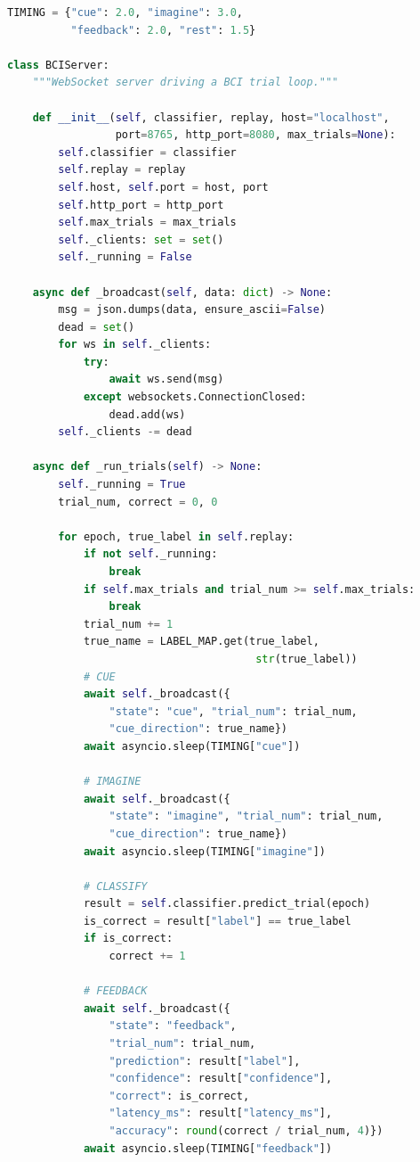 \begin{lstlisting}[language=Python, caption={在线仿真服务端 \texttt{src/online/server.py}\label{code:server}}]
TIMING = {"cue": 2.0, "imagine": 3.0,
          "feedback": 2.0, "rest": 1.5}

class BCIServer:
    """WebSocket server driving a BCI trial loop."""

    def __init__(self, classifier, replay, host="localhost",
                 port=8765, http_port=8080, max_trials=None):
        self.classifier = classifier
        self.replay = replay
        self.host, self.port = host, port
        self.http_port = http_port
        self.max_trials = max_trials
        self._clients: set = set()
        self._running = False

    async def _broadcast(self, data: dict) -> None:
        msg = json.dumps(data, ensure_ascii=False)
        dead = set()
        for ws in self._clients:
            try:
                await ws.send(msg)
            except websockets.ConnectionClosed:
                dead.add(ws)
        self._clients -= dead

    async def _run_trials(self) -> None:
        self._running = True
        trial_num, correct = 0, 0

        for epoch, true_label in self.replay:
            if not self._running:
                break
            if self.max_trials and trial_num >= self.max_trials:
                break
            trial_num += 1
            true_name = LABEL_MAP.get(true_label,
                                       str(true_label))
            # CUE
            await self._broadcast({
                "state": "cue", "trial_num": trial_num,
                "cue_direction": true_name})
            await asyncio.sleep(TIMING["cue"])

            # IMAGINE
            await self._broadcast({
                "state": "imagine", "trial_num": trial_num,
                "cue_direction": true_name})
            await asyncio.sleep(TIMING["imagine"])

            # CLASSIFY
            result = self.classifier.predict_trial(epoch)
            is_correct = result["label"] == true_label
            if is_correct:
                correct += 1

            # FEEDBACK
            await self._broadcast({
                "state": "feedback",
                "trial_num": trial_num,
                "prediction": result["label"],
                "confidence": result["confidence"],
                "correct": is_correct,
                "latency_ms": result["latency_ms"],
                "accuracy": round(correct / trial_num, 4)})
            await asyncio.sleep(TIMING["feedback"])


\end{lstlisting}

